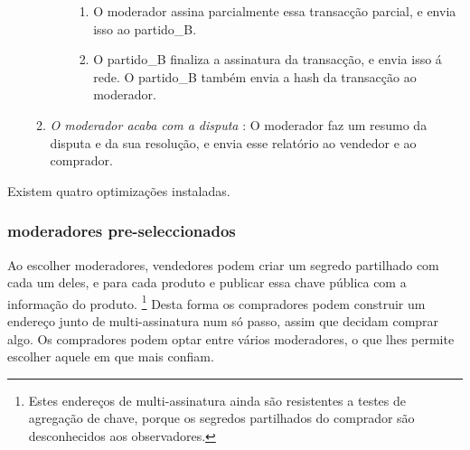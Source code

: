 \begin{enumerate}
\begin{enumerate}
\begin{enumerate}
\begin{enumerate}
                \item O moderador assina parcialmente essa transacção parcial, e envia isso ao partido\_B.
                \item O partido\_B finaliza a assinatura da transacção, e envia isso á rede. O partido\_B também envia a hash da transacção ao moderador.   
            \end{enumerate}{}
        \end{enumerate}{}
        \item {\em O moderador acaba com a disputa} : O moderador faz um resumo da disputa e da sua resolução, e envia esse relatório ao vendedor e ao comprador.
    \end{enumerate}{}
\end{enumerate}{}

\fi

Existem quatro optimizações instaladas.

\subsubsection*{moderadores pre-seleccionados}

Ao escolher moderadores, vendedores podem criar um segredo partilhado com cada um deles, e para cada produto e publicar essa chave pública com a informação do produto. 
\footnote{Estes endereços de multi-assinatura ainda são resistentes a testes de agregação de chave, porque os segredos partilhados do comprador são desconhecidos aos observadores.}  
Desta forma os compradores podem construir um endereço junto de multi-assinatura num só passo, assim que decidam comprar algo. Os compradores podem optar entre vários moderadores, o que lhes permite escolher aquele em que mais confiam.  

